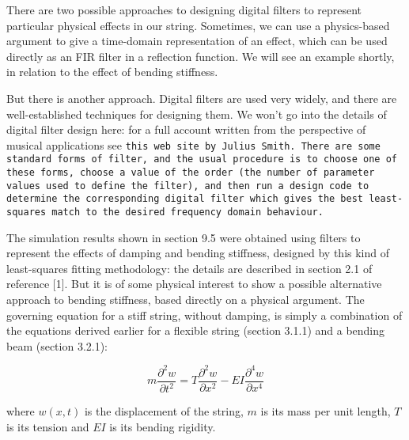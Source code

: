   There are two possible approaches to designing digital filters to represent 
  particular physical effects in our string. Sometimes, we can use a 
  physics-based argument to give a time-domain representation of an effect, 
  which can be used directly as an FIR filter in a reflection function. We will 
  see an example shortly, in relation to the effect of bending stiffness. 

  But there is another approach. Digital filters are used very widely, and 
  there are well-established techniques for designing them. We won't go into 
  the details of digital filter design here: for a full account written from 
  the perspective of musical applications see \tt{}this web site\rm{} by Julius 
  Smith. There are some standard forms of filter, and the usual procedure is to 
  choose one of these forms, choose a value of the order (the number of 
  parameter values used to define the filter), and then run a design code to 
  determine the corresponding digital filter which gives the best least-squares 
  match to the desired frequency domain behaviour. 

  The simulation results shown in section 9.5 were obtained using filters to 
  represent the effects of damping and bending stiffness, designed by this kind 
  of least-squares fitting methodology: the details are described in section 
  2.1 of reference [1]. But it is of some physical interest to show a possible 
  alternative approach to bending stiffness, based directly on a physical 
  argument. The governing equation for a stiff string, without damping, is 
  simply a combination of the equations derived earlier for a flexible string 
  (section 3.1.1) and a bending beam (section 3.2.1): 

  \begin{equation*}m \dfrac{\partial^2 w}{\partial t^2} =T \dfrac{\partial^2 
  w}{\partial x^2}-EI \dfrac{\partial^4 w}{\partial x^4} \tag{8}\end{equation*} 

  \noindent{}where $w(x,t)$ is the displacement of the string, $m$ is its mass 
  per unit length, $T$ is its tension and $EI$ is its bending rigidity. 

